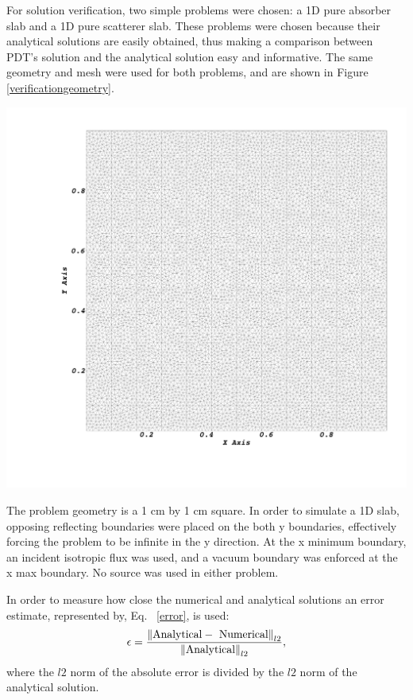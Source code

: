 For solution verification, two simple problems were chosen: a 1D pure absorber slab and a 1D pure scatterer slab. These problems were chosen because their analytical solutions are easily obtained, thus making a comparison between PDT's solution and the analytical solution easy and informative. The same geometry and mesh were used for both problems, and are shown in Figure \ref{verificationgeometry}.

\noindent\begin{minipage}{\textwidth}
\centering
\includegraphics[scale = 0.12,trim = 10cm 10cm 0cm 0cm ]{figures/solutionmesh.png}
\label{verificationgeometry}
\end{minipage}
\smallskip

The problem geometry is a 1 cm by 1 cm square. In order to simulate a 1D slab, opposing reflecting boundaries were placed on the both y boundaries, effectively forcing the problem to be infinite in the y direction. At the x minimum boundary, an incident isotropic flux was used, and a vacuum boundary was enforced at the x max boundary. No source was used in either problem.

In order to measure how close the numerical and analytical solutions an error estimate, represented by, Eq. ~\eqref{error}, is used:
\begin{equation}
\epsilon = \frac{\left\lVert\text{Analytical} - \text{ Numerical}\right\rVert_{l2}}{\left\lVert\text{Analytical}\right\rVert_{l2}},
\label{error}
\end{equation}
where the $l2$ norm of the absolute error is divided by the $l2$ norm of the analytical solution.

